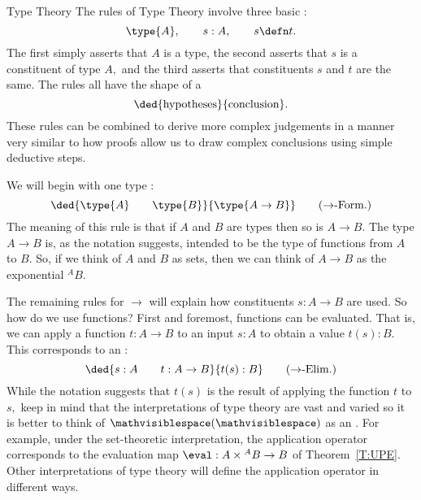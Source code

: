 \begin{unit}{Type Theory}
The rules of Type Theory involve three basic :
\[\type{A}, \qquad s:A, \qquad s \defn t.\]
The first simply asserts that \(A\) is a type, the second asserts that \(s\) is a constituent of type \(A,\) and the third asserts that constituents \(s\) and \(t\) are the same.
The rules all have the shape of a  \[\ded{\text{hypotheses}}{\text{conclusion}}.\]
These rules can be combined to derive more complex judgements in a manner very similar to how proofs allow us to draw complex conclusions using simple deductive steps.

We will begin with one type :
\[\ded{\type{A} \qquad \type{B}}{\type{A \to B}} \tag{$\to$-Form.}\]
The meaning of this rule is that if \(A\) and \(B\) are types then so is \(A \to B.\)
The type \(A \to B\) is, as the notation suggests, intended to be the type of functions from \(A\) to \(B.\)
So, if we think of \(A\) and \(B\) as sets, then we can think of \(A \to B\) as the exponential \({}^AB.\)

The remaining rules for \(\to\) will explain how constituents \(s:A \to B\) are used.
So how do we use functions?
First and foremost, functions can be evaluated.
That is, we can apply a function \(t:A \to B\) to an input \(s: A\) to obtain a value \(t(s) : B.\)
This corresponds to an :%
\[\ded{s : A \qquad t : A \to B}{t(s) : B} \tag{$\to$-Elim.}\]
While the notation suggests that \(t(s)\) is the result of applying the function \(t\) to \(s,\) keep in mind that the interpretations of type theory are vast and varied so it is better to think of \(\mathvisiblespace(\mathvisiblespace)\) as an . 
For example, under the set-theoretic interpretation, the application operator corresponds to the evaluation map \(\eval:A \times {}^AB  \to B\) of Theorem~\ref{T:UPE}.
Other interpretations of type theory will define the application operator in different ways.


\end{unit}
